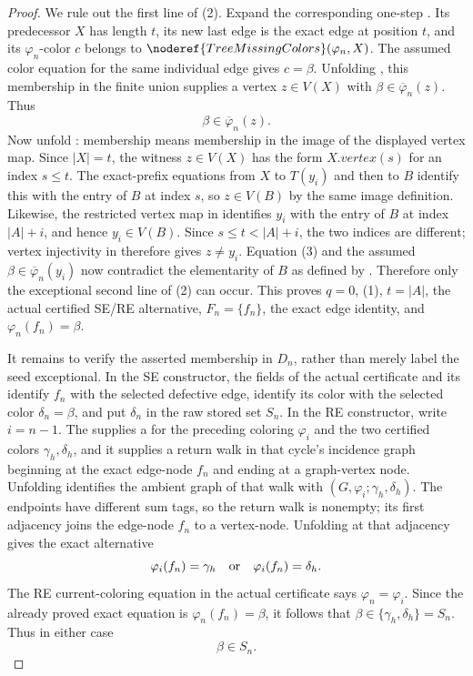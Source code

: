 \begin{proof}
We rule out the first line of (2).  Expand the corresponding one-step
.  Its predecessor $X$ has length $t$,
its new last edge is the exact edge at position $t$, and its
$\varphi_n$-color $c$ belongs to
$\noderef{TreeMissingColors}(\varphi_n,X)$.  The assumed color equation
for the same individual edge gives $c=\beta$.  Unfolding
, this membership in the finite union supplies
a vertex $z\in V(X)$ with $\beta\in\overline\varphi_n(z)$.  Thus
\[
             \beta\in\overline\varphi_n(z).                   \tag{3}
\]
Now unfold : membership means membership
in the image of the displayed vertex map.  Since $|X|=t$, the witness
$z\in V(X)$ has the form $X.\mathit{vertex}(s)$ for an index
$s\leq t$.  The exact-prefix equations from $X$ to $T(y_i)$ and then to
$B$ identify this with the entry of $B$ at index $s$, so $z\in V(B)$ by
the same image definition.  Likewise, the restricted vertex map in
 identifies $y_i$ with the entry of $B$ at
index $|A|+i$, and hence $y_i\in V(B)$.  Since
$s\leq t<|A|+i$, the two indices are different; vertex injectivity in
 therefore gives $z\ne y_i$.  Equation (3) and the
assumed $\beta\in\overline\varphi_n(y_i)$ now contradict the elementarity
of $B$ as defined by .  Therefore
only the exceptional second line of (2) can occur.  This proves $q=0$,
(1), $t=|A|$, the actual certified SE/RE alternative,
$F_n=\{f_n\}$, the exact edge identity, and
$\varphi_n(f_n)=\beta$.

It remains to verify the asserted membership in $D_n$, rather than
merely label the seed exceptional.  In the SE constructor, the fields of
the actual  certificate and its
 identify $f_n$ with the selected
defective edge, identify its color with the selected color
$\delta_n=\beta$, and put $\delta_n$ in the raw stored set $S_n$.  In the
RE constructor, write $i=n-1$.  The
 supplies a
 for the preceding coloring $\varphi_i$ and the
two certified colors $\gamma_h,\delta_h$, and it supplies a return walk
in that cycle's incidence graph beginning at the exact edge-node $f_n$
and ending at a graph-vertex node.  Unfolding
 identifies the ambient graph of that walk with
$(G,\varphi_i;\gamma_h,\delta_h)$.
The endpoints have different sum tags, so the return walk is nonempty;
its first adjacency joins the edge-node $f_n$ to a vertex-node.
Unfolding  at that adjacency gives the
exact alternative
\[
        \varphi_i(f_n)=\gamma_h\quad\hbox{or}\quad
        \varphi_i(f_n)=\delta_h.
\]
The RE current-coloring equation in the actual
 certificate says
$\varphi_n=\varphi_i$.  Since the already proved exact equation is
$\varphi_n(f_n)=\beta$, it follows that
$\beta\in\{\gamma_h,\delta_h\}=S_n$.  Thus in either case
\[
                              \beta\in S_n.                    \tag{4}
\]


\end{proof}
